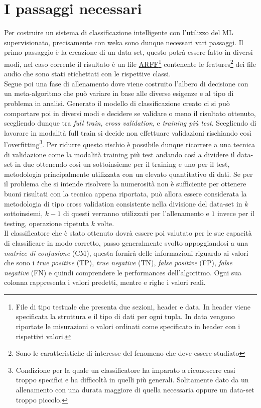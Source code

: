 \section{I passaggi necessari}
Per costruire un sistema di classificazione intelligente con l'utilizzo del ML supervisionato, precisamente con weka sono dunque necessari vari passaggi. Il primo passaggio è la creazione di un data-set, questo potrà essere fatto in diversi modi, nel caso corrente il risultato è un file \href{https://www.cs.waikato.ac.nz/ml/weka/arff.html}{ARFF}\footnote{File di tipo testuale che presenta due sezioni, header e data. In header viene specificata la struttura e il tipo di dati per ogni tupla. In data vengono riportate le misurazioni o valori ordinati come specificato in header con i rispettivi valori.} contenente le features\footnote{Sono le caratteristiche di interesse del fenomeno che deve essere studiato} dei file audio che sono stati etichettati con le rispettive classi.\\
Segue poi una fase di allenamento dove viene costruito l'albero di decisione con un meta-algoritmo che può variare in base alle diverse esigenze e al tipo di problema in analisi. Generato il modello di classificazione creato ci si può comportare poi in diversi modi e decidere se validare o meno il risultato ottenuto, scegliendo dunque tra \emph{full train}, \emph{cross validation}, e \emph{training più test}. Scegliendo di lavorare in modalità full train si decide non effettuare validazioni rischiando così l'overfitting\footnote{Condizione per la quale un classificatore ha imparato a riconoscere casi troppo specifici e ha difficoltà in quelli più generali. Solitamente dato da un allenamento con una durata maggiore di quella necessaria oppure un data-set troppo piccolo.}. Per ridurre questo rischio è possibile dunque ricorrere a una tecnica di validazione come la modalità training più test andando così a dividere il data-set in due ottenendo così un sottoinsieme per il training e uno per il test, metodologia principalmente utilizzata con un elevato quantitativo di dati. Se per il problema che si intende risolvere la numerosità non è sufficiente per ottenere buoni risultati con la tecnica appena riportata, può allora essere considerata la metodologia di tipo cross validation consistente nella divisione del data-set in $k$ sottoinsiemi, $k-1$ di questi verranno utilizzati per l'allenamento e $1$ invece per il testing, operazione ripetuta $k$ volte.\\
Il classificatore che è stato ottenuto dovrà essere poi valutato per le sue capacità di classificare in modo corretto, passo generalmente svolto appoggiandosi a una \emph{matrice di confusione} (CM), questa fornirà delle informazioni riguardo ai valori che sono i \emph{true positive} (TP), \emph{true negative} (TN), \emph{false positive} (FP), \emph{false negative} (FN) e quindi comprendere le performances dell'algoritmo. Ogni sua colonna rappresenta i valori predetti, mentre e righe i valori reali.\\
